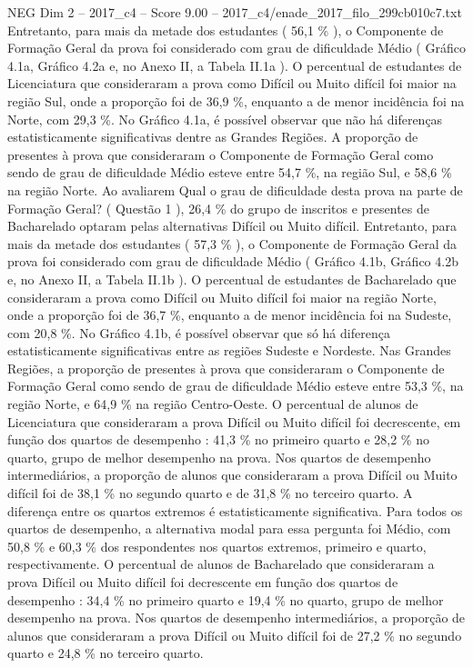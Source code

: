 \begin{textsample}{NEG Dim 2 – 2017\_c4 – Score 9.00 – 2017\_c4/enade\_2017\_filo\_299cb010c7.txt}
Entretanto, para mais da metade dos estudantes ( 56,1 \% ), o Componente de Formação Geral da prova foi considerado com grau de dificuldade Médio ( Gráfico 4.1a, Gráfico 4.2a e, no Anexo II, a Tabela II.1a ).
O percentual de estudantes de Licenciatura que consideraram a prova como Difícil ou Muito difícil foi maior na região Sul, onde a proporção foi de 36,9 \%, enquanto a de menor incidência foi na Norte, com 29,3 \%.
No Gráfico 4.1a, é possível observar que não há diferenças estatisticamente significativas dentre as Grandes Regiões.
A proporção de presentes à prova que consideraram o Componente de Formação Geral como sendo de grau de dificuldade Médio esteve entre 54,7 \%, na região Sul, e 58,6 \% na região Norte.
Ao avaliarem Qual o grau de dificuldade desta prova na parte de Formação Geral? ( Questão 1 ), 26,4 \% do grupo de inscritos e presentes de Bacharelado optaram pelas alternativas Difícil ou Muito difícil.
Entretanto, para mais da metade dos estudantes ( 57,3 \% ), o Componente de Formação Geral da prova foi considerado com grau de dificuldade Médio ( Gráfico 4.1b, Gráfico 4.2b e, no Anexo II, a Tabela II.1b ).
O percentual de estudantes de Bacharelado que consideraram a prova como Difícil ou Muito difícil foi maior na região Norte, onde a proporção foi de 36,7 \%, enquanto a de menor incidência foi na Sudeste, com 20,8 \%.
No Gráfico 4.1b, é possível observar que só há diferença estatisticamente significativas entre as regiões Sudeste e Nordeste.
Nas Grandes Regiões, a proporção de presentes à prova que consideraram o Componente de Formação Geral como sendo de grau de dificuldade Médio esteve entre 53,3 \%, na região Norte, e 64,9 \% na região Centro-Oeste.
O percentual de alunos de Licenciatura que consideraram a prova Difícil ou Muito difícil foi decrescente, em função dos quartos de desempenho : 41,3 \% no primeiro quarto e 28,2 \% no quarto, grupo de melhor desempenho na prova.
Nos quartos de desempenho intermediários, a proporção de alunos que consideraram a prova Difícil ou Muito difícil foi de 38,1 \% no segundo quarto e de 31,8 \% no terceiro quarto.
A diferença entre os quartos extremos é estatisticamente significativa.
Para todos os quartos de desempenho, a alternativa modal para essa pergunta foi Médio, com 50,8 \% e 60,3 \% dos respondentes nos quartos extremos, primeiro e quarto, respectivamente.
O percentual de alunos de Bacharelado que consideraram a prova Difícil ou Muito difícil foi decrescente em função dos quartos de desempenho : 34,4 \% no primeiro quarto e 19,4 \% no quarto, grupo de melhor desempenho na prova.
Nos quartos de desempenho intermediários, a proporção de alunos que consideraram a prova Difícil ou Muito difícil foi de 27,2 \% no segundo quarto e 24,8 \% no terceiro quarto.

\end{textsample}
